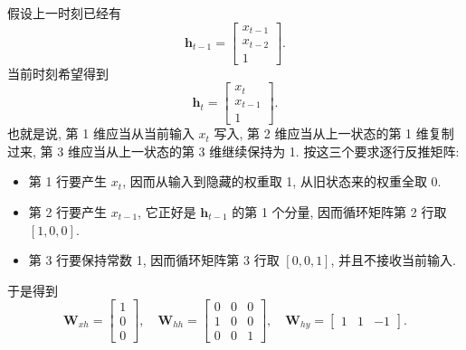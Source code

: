 \documentclass{../nndlcourse}
\begin{document}
\begin{enumerate}
    假设上一时刻已经有
    \begin{equation*}
      \boldsymbol{h}_{t-1} =
      \begin{bmatrix}
        x_{t-1} \\
        x_{t-2} \\
        1
      \end{bmatrix}.
    \end{equation*}
    当前时刻希望得到
    \begin{equation*}
      \boldsymbol{h}_t =
      \begin{bmatrix}
        x_t \\
        x_{t-1} \\
        1
      \end{bmatrix}.
    \end{equation*}
    也就是说, 第 1 维应当从当前输入 $x_t$ 写入, 第 2 维应当从上一状态的第 1 维复制过来, 第 3 维应当从上一状态的第 3 维继续保持为 1. 按这三个要求逐行反推矩阵:
    \begin{itemize}
      \item 第 1 行要产生 $x_t$, 因而从输入到隐藏的权重取 1, 从旧状态来的权重全取 0.
      \item 第 2 行要产生 $x_{t-1}$, 它正好是 $\boldsymbol{h}_{t-1}$ 的第 1 个分量, 因而循环矩阵第 2 行取 $[1,0,0]$.
      \item 第 3 行要保持常数 1, 因而循环矩阵第 3 行取 $[0,0,1]$, 并且不接收当前输入.
    \end{itemize}
    于是得到
    \begin{equation*}
      \boldsymbol{W}_{xh} =
      \begin{bmatrix}
        1 \\
        0 \\
        0
      \end{bmatrix},
      \quad
      \boldsymbol{W}_{hh} =
      \begin{bmatrix}
        0 & 0 & 0 \\
        1 & 0 & 0 \\
        0 & 0 & 1
      \end{bmatrix},
      \quad
      \boldsymbol{W}_{hy} =
      \begin{bmatrix}
        1 & 1 & -1
      \end{bmatrix}.
    \end{equation*}


\end{enumerate}
\end{document}

